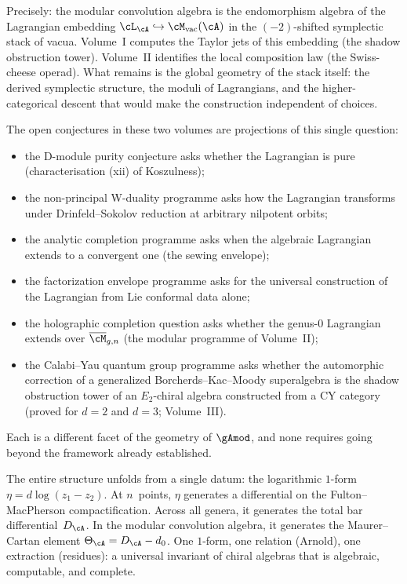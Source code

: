 \noindent
Precisely: the modular convolution algebra is the endomorphism
algebra of the Lagrangian embedding
$\cL_\cA \hookrightarrow \cM_{\mathrm{vac}}(\cA)$ in the
$(-2)$-shifted symplectic stack of vacua. Volume~I computes
the Taylor jets of this embedding (the shadow obstruction tower).
Volume~II identifies the local composition law (the Swiss-cheese
operad). What remains is the global geometry of the stack itself:
the derived symplectic structure, the moduli of Lagrangians, and
the higher-categorical descent that would make the construction
independent of choices.

The open conjectures in these two volumes are projections
of this single question:
\begin{itemize}[nosep]
\item the D-module purity conjecture asks whether the Lagrangian
 is pure (characterisation (xii) of Koszulness);
\item the non-principal W-duality programme asks how the Lagrangian
 transforms under Drinfeld--Sokolov reduction at arbitrary
 nilpotent orbits;
\item the analytic completion programme asks when the algebraic
 Lagrangian extends to a convergent one (the sewing envelope);
\item the factorization envelope programme asks for the universal
 construction of the Lagrangian from Lie conformal data alone;
\item the holographic completion question asks whether the genus-$0$
 Lagrangian extends over $\overline{\cM}_{g,n}$ (the modular
 programme of Volume~II);
\item the Calabi--Yau quantum group programme asks whether the
 automorphic correction of a generalized Borcherds--Kac--Moody
 superalgebra is the shadow obstruction tower of an $E_2$-chiral
 algebra constructed from a CY category (proved for $d=2$
 and $d=3$; Volume~III).
\end{itemize}
Each is a different facet of the geometry of
$\gAmod$, and none requires going
beyond the framework already established.

\bigskip

\noindent
The entire structure unfolds from a single datum: the logarithmic
$1$-form $\eta = d\log(z_1 - z_2)$. At $n$~points, $\eta$ generates a
differential on the Fulton--MacPherson compactification. Across all
genera, it generates the total bar differential~$D_\cA$. In the modular
convolution algebra, it generates the Maurer--Cartan element
$\Theta_\cA = D_\cA - d_0$. One $1$-form, one relation (Arnold),
one extraction (residues): a universal invariant of chiral algebras
that is algebraic, computable, and complete.
